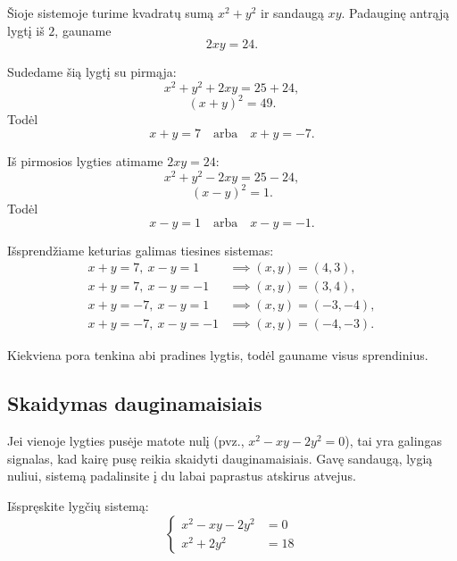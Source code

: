 \documentclass[11pt,a4paper]{scrartcl}
\begin{document}
\begin{solution}
Šioje sistemoje turime kvadratų sumą $x^2+y^2$ ir sandaugą $xy$. Padauginę antrąją lygtį iš $2$, gauname
\[
2xy=24.
\]

Sudedame šią lygtį su pirmąja:
\[
x^2+y^2+2xy=25+24,
\]
\[
(x+y)^2=49.
\]
Todėl
\[
x+y=7 \quad\text{arba}\quad x+y=-7.
\]

Iš pirmosios lygties atimame $2xy=24$:
\[
x^2+y^2-2xy=25-24,
\]
\[
(x-y)^2=1.
\]
Todėl
\[
x-y=1 \quad\text{arba}\quad x-y=-1.
\]

Išsprendžiame keturias galimas tiesines sistemas:
\begin{align*}
    x+y=7,\ x-y=1 &\implies (x,y)=(4,3), \\
    x+y=7,\ x-y=-1 &\implies (x,y)=(3,4), \\
    x+y=-7,\ x-y=1 &\implies (x,y)=(-3,-4), \\
    x+y=-7,\ x-y=-1 &\implies (x,y)=(-4,-3).
\end{align*}

Kiekviena pora tenkina abi pradines lygtis, todėl gauname visus sprendinius.

\end{solution}

\subsection{Skaidymas dauginamaisiais}
Jei vienoje lygties pusėje matote nulį (pvz., $x^2 - xy - 2y^2 = 0$), tai yra galingas signalas, kad kairę pusę reikia skaidyti dauginamaisiais. Gavę sandaugą, lygią nuliui, sistemą padalinsite į du labai paprastus atskirus atvejus.

\begin{example}
Išspręskite lygčių sistemą:
\[
\left\{\begin{aligned}
    x^2 - xy - 2y^2 &= 0 \\
    x^2 + 2y^2 &= 18
\end{aligned}\right.
\]
\end{example}
\end{document}
